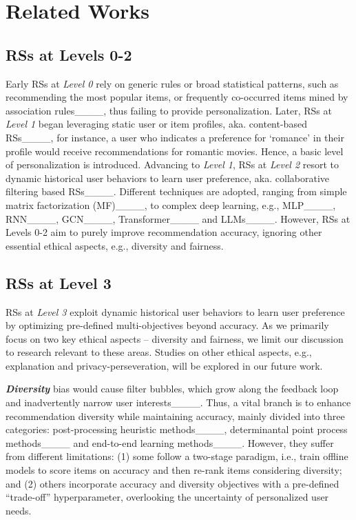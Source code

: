 \section{Related Works}
\subsection{RSs at Levels 0-2} 
Early RSs at \textit{Level 0} rely on generic rules or broad statistical patterns, such as recommending the most popular items, or frequently co-occurred items mined by association rules____, thus failing to provide personalization.
%
Later, RSs at \textit{Level 1} began leveraging static user or item profiles, aka. content-based RSs____, for instance, a user who indicates a preference for `romance' in their profile would receive recommendations for romantic movies. Hence, a basic level of personalization is introduced.
%
Advancing to \textit{Level 1}, RSs at \textit{Level 2} resort to dynamic historical user behaviors to learn user preference, aka. collaborative filtering based RSs____. Different techniques are adopted, ranging from simple matrix factorization (MF)____, to complex deep learning, e.g., MLP____, RNN____, GCN____, Transformer____ and LLMs____.  
%
However, RSs at Levels 0-2 aim to purely improve recommendation accuracy, ignoring other essential ethical aspects, e.g., diversity and fairness. 
 
\subsection{RSs at Level 3}
RSs at \textit{Level 3} exploit dynamic historical user behaviors to learn user preference by optimizing pre-defined multi-objectives beyond accuracy. As we primarily focus on two key ethical aspects -- diversity and fairness, we limit our discussion to research relevant to these areas. Studies on other ethical aspects, e.g., explanation and privacy-perseveration, will be explored in our future work.  

\smallskip\noindent\textit{\textbf{Diversity}} bias would cause filter bubbles, which grow along the feedback loop and inadvertently narrow user interests____. Thus, a vital branch is to enhance recommendation diversity while maintaining accuracy, mainly divided into three categories: post-processing heuristic methods____, determinantal point process methods____ and end-to-end learning methods____. However, they suffer from different limitations: (1) some follow a two-stage paradigm, i.e., train offline models to score items on accuracy and then re-rank items considering diversity; and (2) others incorporate accuracy and diversity objectives with a pre-defined ``trade-off'' hyperparameter, overlooking the uncertainty of personalized user needs. 

